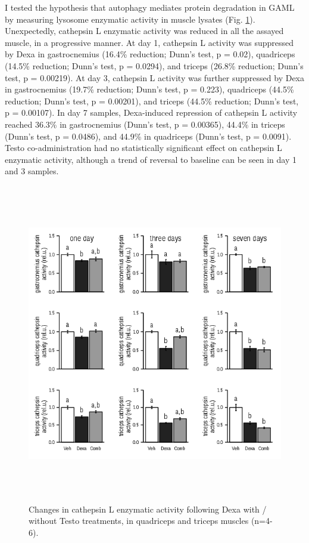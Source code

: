 \documentclass[12pt,english]{report}\usepackage[]{graphicx}\usepackage[]{color}
\newenvironment{knitrout}{}{} %
\begin{document}
I tested the hypothesis that autophagy mediates protein degradation
in GAML by measuring lysosome enzymatic activity in muscle lysates
(Fig. \ref{fig:Cathepsin-enzymatic-activity}). Unexpectedly, cathepsin
L enzymatic activity was reduced in all the assayed muscle, in a progressive
manner. At day 1, cathepsin L activity was suppressed by Dexa in gastrocnemius
(16.4\%
reduction; Dunn's test, p = 0.02),
quadriceps (14.5\%
reduction; Dunn's test, p = 0.0294),
and triceps (26.8\%
reduction; Dunn's test, p = 0.00219).
At day 3, cathepsin L activity was further suppressed by Dexa in gastrocnemius
(19.7\%
reduction; Dunn's test, p = 0.223),
quadriceps (44.5\%
reduction; Dunn's test, p = 0.00201),
and triceps (44.5\%
reduction; Dunn's test, p = 0.00107).
In day 7 samples, Dexa-induced repression of cathepsin L activity
reached 36.3\%
in gastrocnemius (Dunn's test, p = 0.00365),
44.4\%
in triceps (Dunn's test, p = 0.0486),
and 44.9\%
in quadriceps (Dunn's test, p = 0.0091).
Testo co-administration had no statistically significant effect on
cathepsin L enzymatic activity, although a trend of reversal to baseline
can be seen in day 1 and 3 samples.

\begin{figure}
\begin{knitrout}
\color{fgcolor}
\includegraphics[width=6in,height=5.5in]{figure/cathepsinactivity-1} 

\end{knitrout}

\protect\caption[Changes in cathepsin enzymatic activity following Dexa with / without
Testo treatments.]{Changes in cathepsin L enzymatic activity following Dexa with / without
Testo treatments, in quadriceps and triceps muscles (n=4-6).\label{fig:Cathepsin-enzymatic-activity}}
\end{figure}
\end{document}
